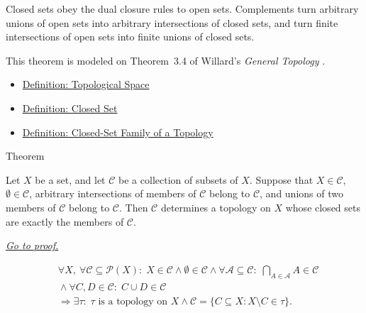 \begin{remark*}[Interpretation]
Closed sets obey the dual closure rules to open sets.  Complements turn
arbitrary unions of open sets into arbitrary intersections of closed sets, and
turn finite intersections of open sets into finite unions of closed sets.
\end{remark*}

\begin{remark*}
This theorem is modeled on Theorem~3.4 of Willard's
\emph{General Topology} \cite{WillardGeneralTopology}.
\end{remark*}


\begin{dependencies}
\begin{itemize}
  \item \hyperref[def:topological-space]{Definition: Topological Space}
  \item \hyperref[def:topological-closed-set]{Definition: Closed Set}
  \item \hyperref[def:closed-set-family-of-topology]{Definition: Closed-Set Family of a Topology}
\end{itemize}
\end{dependencies}

\begin{theorembox}{Theorem}
\begin{theorem}
\label{thm:closed-set-characterization-topologies}
Let \(X\) be a set, and let \(\mathcal{C}\) be a collection of subsets of
\(X\).  Suppose that \(X\in\mathcal{C}\), \(\emptyset\in\mathcal{C}\),
arbitrary intersections of members of \(\mathcal{C}\) belong to
\(\mathcal{C}\), and unions of two members of \(\mathcal{C}\) belong to
\(\mathcal{C}\).  Then \(\mathcal{C}\) determines a topology on \(X\) whose
closed sets are exactly the members of \(\mathcal{C}\).

\smallskip
\noindent
\hyperref[prf:closed-set-characterization-topologies]{\textit{Go to proof.}}
\end{theorem}
\end{theorembox}

\begin{remark*}
\[
\begin{aligned}
&\forall X,\ \forall\mathcal{C}\subseteq\mathcal{P}(X){:}\;
X\in\mathcal{C}
\land
\emptyset\in\mathcal{C}
\land
\forall\mathcal{A}\subseteq\mathcal{C}{:}\;
\bigcap_{A\in\mathcal{A}}A\in\mathcal{C}
\\
&{}\land
\forall C,D\in\mathcal{C}{:}\;
C\cup D\in\mathcal{C}
\\
&\Longrightarrow
\exists\tau{:}\;
\tau\text{ is a topology on }X
\land
\mathcal{C}
=
\{C\subseteq X:X\setminus C\in\tau\}.
\end{aligned}
\]
\end{remark*}

